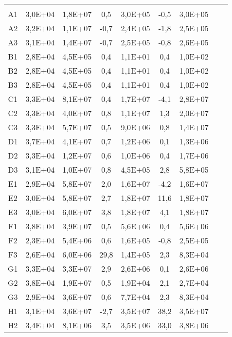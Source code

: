 \begin{center}
\begin{longtable}{ccccccccc}
\toprule
\endhead
\midrule \\ %
\endfoot
\bottomrule 
\endlastfoot
A1    & 3,0E+04 & 1,8E+07 & 0,5   & 3,0E+05 & -0,5  & 3,0E+05 \\
A2    & 3,2E+04 & 1,1E+07 & -0,7  & 2,4E+05 & -1,8  & 2,5E+05 \\
A3    & 3,1E+04 & 1,4E+07 & -0,7  & 2,5E+05 & -0,8  & 2,6E+05 \\
B1    & 2,8E+04 & 4,5E+05 & 0,4   & 1,1E+01 & 0,4   & 1,0E+02 \\
B2    & 2,8E+04 & 4,5E+05 & 0,4   & 1,1E+01 & 0,4   & 1,0E+02 \\
B3    & 2,8E+04 & 4,5E+05 & 0,4   & 1,1E+01 & 0,4   & 1,0E+02 \\
C1    & 3,3E+04 & 8,1E+07 & 0,4   & 1,7E+07 & -4,1  & 2,8E+07 \\
C2    & 3,3E+04 & 4,0E+07 & 0,8   & 1,1E+07 & 1,3   & 2,0E+07 \\
C3    & 3,3E+04 & 5,7E+07 & 0,5   & 9,0E+06 & 0,8   & 1,4E+07 \\
D1    & 3,7E+04 & 4,1E+07 & 0,7   & 1,2E+06 & 0,1   & 1,3E+06 \\
D2    & 3,3E+04 & 1,2E+07 & 0,6   & 1,0E+06 & 0,4   & 1,7E+06 \\
D3    & 3,1E+04 & 1,0E+07 & 0,8   & 4,5E+05 & 2,8   & 5,8E+05 \\
E1    & 2,9E+04 & 5,8E+07 & 2,0   & 1,6E+07 & -4,2  & 1,6E+07 \\
E2    & 3,0E+04 & 5,8E+07 & 2,7   & 1,8E+07 & 11,6  & 1,8E+07 \\
E3    & 3,0E+04 & 6,0E+07 & 3,8   & 1,8E+07 & 4,1   & 1,8E+07 \\
F1    & 3,8E+04 & 3,9E+07 & 0,5   & 5,6E+06 & 0,4   & 5,6E+06 \\
F2    & 2,3E+04 & 5,4E+06 & 0,6   & 1,6E+05 & -0,8  & 2,5E+05 \\
F3    & 2,6E+04 & 6,0E+06 & 29,8  & 1,4E+05 & 2,3   & 8,3E+04 \\
G1    & 3,3E+04 & 3,3E+07 & 2,9   & 2,6E+06 & 0,1   & 2,6E+06 \\
G2    & 3,8E+04 & 1,9E+07 & 0,5   & 1,9E+04 & 2,1   & 2,7E+04 \\
G3    & 2,9E+04 & 3,6E+07 & 0,6   & 7,7E+04 & 2,3   & 8,3E+04 \\
H1    & 3,1E+04 & 3,6E+07 & -2,7  & 3,5E+07 & 38,2  & 3,5E+07 \\
H2    & 3,4E+04 & 8,1E+06 & 3,5   & 3,5E+06 & 33,0  & 3,8E+06 \\

\end{longtable}
\end{center}
